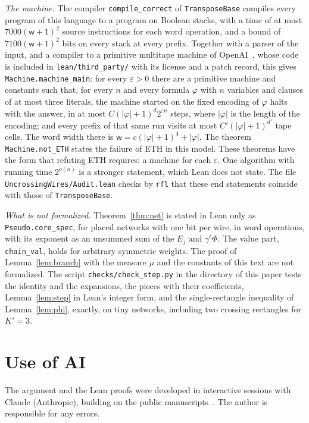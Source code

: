 \documentclass[11pt]{article}
\newcommand{\lean}[1]{\texttt{#1}}
\begin{document}
\medskip\noindent\emph{The machine.} The compiler \lean{compile\_correct} of \lean{TransposeBase} compiles every program of this language to a program on Boolean stacks, with a time of at most $7000(\mathsf w+1)^2$ source instructions for each word operation, and a bound of $7100(\mathsf w+1)^2$ bits on every stack at every prefix. Together with a parser of the input, and a compiler to a primitive multitape machine of OpenAI~\cite{OAIlean}, whose code is included in \texttt{lean/third\_party/} with its license and a patch record, this gives \lean{Machine.machine\_main}: for every $\varepsilon>0$ there are a primitive machine and constants such that, for every $n$ and every formula $\varphi$ with $n$ variables and clauses of at most three literals, the machine started on the fixed encoding of $\varphi$ halts with the answer, in at most $C(|\varphi|+1)^d2^{\varepsilon n}$ steps, where $|\varphi|$ is the length of the encoding; and every prefix of that same run visits at most $C'(|\varphi|+1)^{d'}$ tape cells. The word width there is $\mathsf w=c(|\varphi|+1)^4+|\varphi|$. The theorem \lean{Machine.not\_ETH} states the failure of ETH in this model. These theorems have the form that refuting ETH requires: a machine for each $\varepsilon$. One algorithm with running time $2^{o(n)}$ is a stronger statement, which Lean does not state. The file \lean{UncrossingWires/Audit.lean} checks by \lean{rfl} that these end statements coincide with those of \lean{TransposeBase}.

\medskip\noindent\emph{What is not formalized.} Theorem~\ref{thm:net} is stated in Lean only as \lean{Pseudo.core\_spec}, for placed networks with one bit per wire, in word operations, with its exponent as an unsummed sum of the $E_j$ and $\gamma^\ell\Phi$. The value part, \lean{chain\_val}, holds for arbitrary symmetric weights. The proof of Lemma~\ref{lem:branch} with the measure $\mu$ and the constants of this text are not formalized. The script \texttt{checks/check\_step.py} in the directory of this paper tests the identity and the expansions, the pieces with their coefficients, Lemma~\ref{lem:step} in Lean's integer form, and the single-rectangle inequality of Lemma~\ref{lem:phi}, exactly, on tiny networks, including two crossing rectangles for $K'=3$.

\section*{Use of AI}
The argument and the Lean proofs were developed in interactive sessions with Claude (Anthropic), building on the public manuscripts~\cite{OAI26,OD26,Cla26,Kin26}. The author is responsible for any errors.
\end{document}

